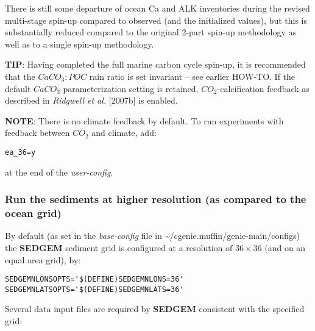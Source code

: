\documentclass[11pt,fleqn]{book} %
\begin{document}
There is still some departure of ocean Ca and ALK inventories during the revised multi-stage spin-up compared to observed (and the initialized values), but this is substantially reduced compared to the original 2-part spin-up methodology as well as to a single spin-up methodology.

\noindent \textbf{TIP}: Having completed the full marine carbon cycle spin-up, it is recommended that the \(CaCO_{3}:POC\) rain ratio is set invariant -- see earlier HOW-TO. If the default \(CaCO_{3}\) parameterization setting is retained, \(CO_{2}\)-calcification feedback as described in \textit{Ridgwell et al.} [2007b] is enabled.

\noindent \textbf{NOTE}: There is no climate feedback by default. To run experiments with feedback between \(CO_{2}\) and climate, add:\vspace{-11pt}\begin{verbatim}ea_36=y\end{verbatim}\vspace{-11pt}
at the end of the \textit{user-config}.

%
\newpage
\subsubsection{Run the sediments at higher resolution (as compared to the ocean grid)}\label{Run the sediments at higher resolution}

By default (as set in the \textit{base-config} file in \textsf{\footnotesize \~{}/cgenie.muffin/genie-main/configs}) the \textbf{SEDGEM} sediment grid is configured at a resolution of \(36\times 36\) (and on an equal area grid), by:
\small\vspace{-1mm}\begin{verbatim}
SEDGEMNLONSOPTS='$(DEFINE)SEDGEMNLONS=36'
SEDGEMNLATSOPTS='$(DEFINE)SEDGEMNLATS=36'
\end{verbatim}\vspace{-1mm}\normalsize
Several data input files are required by \textbf{SEDGEM} consistent with the specified grid:
\end{document}

